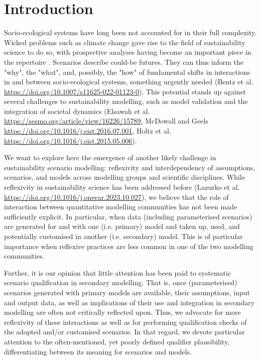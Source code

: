 \documentclass{article}
\begin{document}
\begin{refsection}

\label{intro}
\section{Introduction}
Socio-ecological systems have long been not accounted for in their full complexity. 
Wicked problems such as climate change gave rise to the field of sustainability science to do so, with prospective analyses having become an important piece in the repertoire \parencite{swart_2004}. 
Scenarios describe could-be futures. 
They can thus inform the "why", the "what", and, possibly, the "how" of fundamental shifts in interactions in and between socio-ecological systems, something urgently needed (Bentz et al. \url{https://doi.org/10.1007/s11625-022-01123-0}). 
This potential stands up against several challenges to sustainability modelling, such as model validation and the integration of societal dynamics (Elsawah et al. \url{https://sesmo.org/article/view/16226/15789}, McDowall and Geels \url{https://doi.org/10.1016/j.eist.2016.07.001}, Holtz et al. \url{https://doi.org/10.1016/j.eist.2015.05.006}).

We want to explore here the emergence of another likely challenge in sustainability scenario modelling: reflexivity and interdependency of assumptions, scenarios, and models across modelling groups and scientific disciplines. 
While reflexivity in sustainability science has been addressed before (Lazurko et al. \url{https://doi.org/10.1016/j.oneear.2023.10.027}), we believe that the role of interaction between quantitative modelling communities has not been made sufficiently explicit. 
In particular, when data (including parameterised scenarios) are generated for and with one (i.e. primary) model and taken up, used, and potentially customised in another (i.e. secondary) model. 
This is of particular importance when reflexive practices are less common in one of the two modelling communities. 

Further, it is our opinion that little attention has been paid to systematic scenario qualification in secondary modelling. 
That is, once (parameterised) scenarios generated with primary models are available, their assumptions, input and output data, as well as implications of their use and integration in secondary modelling are often not critically reflected upon.
Thus, we advocate for more reflexivity of these interactions as well as for performing qualification checks of the adopted and/or customised scenarios. 
In that regard, we devote particular attention to the often-mentioned, yet poorly defined qualifier plausibility, differentiating between its meaning for scenarios and models.


\end{refsection}
\end{document}
